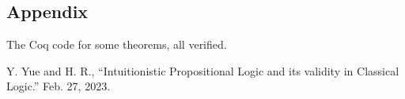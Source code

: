 \documentclass{article}
\newtheorem{theorem}{Theorem}[section]
\newenvironment{proof}{\emph{Proof}.}{\hfill$\square$}
\newcommand{\brs}[1]{\llbracket#1\rrbracket_\sigma}
\begin{document}



\subsection*{Appendix}
The Coq code for some theorems, all verified.


\begin{thebibliography}{9}
     Y. Yue and H. R., “Intuitionistic Propositional Logic and its validity in Classical Logic.” Feb. 27, 2023.
\end{thebibliography}
\end{document}
